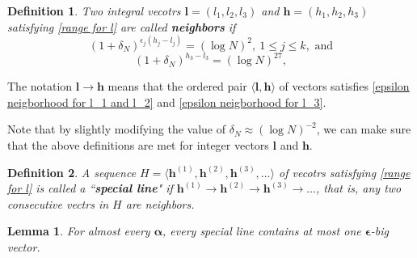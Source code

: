 \documentclass[11pt]{article}
\newtheorem{lem}[thm]{Lemma}
\newtheorem{Def}{Definition}[section]
\newcommand{\beq}{\begin{equation}}
\newcommand{\eeq}{\end{equation}}
\newcommand{\ra}{\rightarrow}
\newcommand{\e}{\epsilon}
\renewcommand{\(}{\left(}
\renewcommand{\)}{\right)}
\renewcommand{\bf}{\mathbf}
\renewcommand{\d}{\delta}
\newcommand{\bma}{\bm{\alpha}}
\newcommand{\<}{\langle}
\renewcommand{\>}{\rangle}
\begin{document}
\begin{Def}
Two integral vecotrs $\bf{l}=(l_1,l_2,l_3)$ and $\bf{h}=(h_1,h_2,h_3)$ satisfying \eqref{range for l} are called \textbf{neighbors} if 
\beq\label{epsilon neigborhood for l_1 and l_2}
(1+\d_N)^{\e_j(h_j-l_j)}=(\log N)^2, \ 1\le j\le k, \text{ and}
\eeq
\beq\label{epsilon neigborhood for l_3}
(1+\d_N)^{h_3-l_3}=(\log N)^{27}, 
\eeq
\end{Def}
The notation $\bf{l} {\ra} \bf{h}$ means that the ordered pair  $\bf{\<l, h\>}$ of vectors satisfies \eqref{epsilon neigborhood for l_1 and l_2} and \eqref{epsilon neigborhood for l_3}.

Note that by slightly modifying the value of $\d_N\approx (\log N)^{-2}$, we can make sure that the above definitions are met for integer vectors $\bf{l}$ and $\bf{h}$.

\begin{Def}
A sequence $H=\<\bf{h}^{(1)},\bf{h}^{(2)},\bf{h}^{(3)},\dots\>$ of vecotrs satisfying \eqref{range for l} is called a ``\textbf{special line}" if $\bf{h}^{(1)} {\ra}\bf{h}^{(2)} {\ra}\bf{h}^{(3)} {\ra}\dots$, that is, any two consecutive vectrs in $H$ are neighbors.
\end{Def}

\begin{lem}\label{key lemma}
For almost every $\bma$, every special line contains at most one $\bm{\e}$-big vector.
\end{lem}
\end{document}
